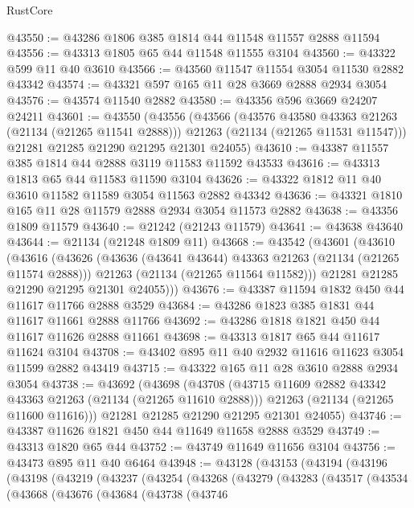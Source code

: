 \begin{lexlean}{RustCore}
\begin{coremodule}
@43550 := @43286 @1806 @385 @1814 @44 @11548 @11557 @2888 @11594
@43556 := @43313 @1805 @65 @44 @11548 @11555 @3104
@43560 := @43322 @599 @11 @40 @3610
@43566 := @43560 @11547 @11554 @3054 @11530 @2882 @43342
@43574 := @43321 @597 @165 @11 @28 @3669 @2888 @2934 @3054
@43576 := @43574 @11540 @2882
@43580 := @43356 @596 @3669 @24207 @24211
@43601 := @43550
    (@43556
      (@43566
        (@43576 @43580 @43363 @21263 (@21134 (@21265 @11541 @2888)))
        @21263
        (@21134 (@21265 @11531 @11547)))
      @21281
      @21285
      @21290
      @21295
      @21301
      @24055)
@43610 := @43387 @11557 @385 @1814 @44 @2888 @3119 @11583 @11592 @43533
@43616 := @43313 @1813 @65 @44 @11583 @11590 @3104
@43626 := @43322 @1812 @11 @40 @3610 @11582 @11589 @3054 @11563 @2882 @43342
@43636 := @43321 @1810 @165 @11 @28 @11579 @2888 @2934 @3054 @11573 @2882
@43638 := @43356 @1809 @11579
@43640 := @21242 (@21243 @11579)
@43641 := @43638 @43640
@43644 := @21134 (@21248 @1809 @11)
@43668 := @43542
    (@43601
      (@43610
        (@43616
          (@43626
            (@43636 (@43641 @43644) @43363 @21263 (@21134 (@21265 @11574 @2888)))
            @21263
            (@21134 (@21265 @11564 @11582)))
          @21281
          @21285
          @21290
          @21295
          @21301
          @24055)))
@43676 := @43387 @11594 @1832 @450 @44 @11617 @11766 @2888 @3529
@43684 := @43286 @1823 @385 @1831 @44 @11617 @11661 @2888 @11766
@43692 := @43286 @1818 @1821 @450 @44 @11617 @11626 @2888 @11661
@43698 := @43313 @1817 @65 @44 @11617 @11624 @3104
@43708 := @43402 @895 @11 @40 @2932 @11616 @11623 @3054 @11599 @2882 @43419
@43715 := @43322 @165 @11 @28 @3610 @2888 @2934 @3054
@43738 := @43692
    (@43698
      (@43708
        (@43715 @11609 @2882 @43342 @43363 @21263 (@21134 (@21265 @11610 @2888)))
        @21263
        (@21134 (@21265 @11600 @11616)))
      @21281
      @21285
      @21290
      @21295
      @21301
      @24055)
@43746 := @43387 @11626 @1821 @450 @44 @11649 @11658 @2888 @3529
@43749 := @43313 @1820 @65 @44
@43752 := @43749 @11649 @11656 @3104
@43756 := @43473 @895 @11 @40 @6464
@43948 := @43128
    (@43153
      (@43194
        (@43196
          (@43198
            (@43219
              (@43237
                (@43254
                  (@43268
                    (@43279
                      (@43283
                        (@43517
                          (@43534
                            (@43668
                              (@43676
                                (@43684
                                  (@43738
                                    (@43746

\end{coremodule}
\end{lexlean}
